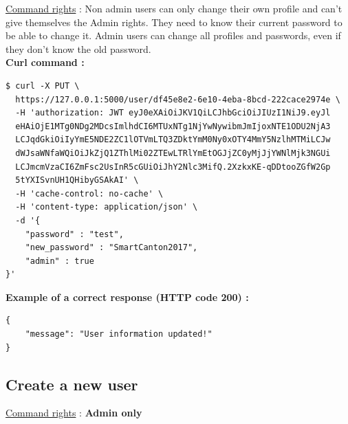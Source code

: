 \underline{Command rights} : Non admin users can only change their own profile and can't give themselves the Admin rights. They need to know their current password to be able to change it. Admin users can change all profiles and passwords, even if they don't know the old password.\\

\textbf{Curl command :}

\begin{tcolorbox}[top=-3mm, bottom=-3mm, left=0mm, right=0mm, enhanced, breakable, colback=LightGray, colframe=DarkGray, colbacktitle=DarkGray]
\begin{verbatim}
$ curl -X PUT \
  https://127.0.0.1:5000/user/df45e8e2-6e10-4eba-8bcd-222cace2974e \
  -H 'authorization: JWT eyJ0eXAiOiJKV1QiLCJhbGciOiJIUzI1NiJ9.eyJl
  eHAiOjE1MTg0NDg2MDcsImlhdCI6MTUxNTg1NjYwNywibmJmIjoxNTE1ODU2NjA3
  LCJqdGkiOiIyYmE5NDE2ZC1lOTVmLTQ3ZDktYmM0Ny0xOTY4MmY5NzlhMTMiLCJw
  dWJsaWNfaWQiOiJkZjQ1ZThlMi02ZTEwLTRlYmEtOGJjZC0yMjJjYWNlMjk3NGUi
  LCJmcmVzaCI6ZmFsc2UsInR5cGUiOiJhY2Nlc3MifQ.2XzkxKE-qDDtooZGfW2Gp
  5tYXISvnUH1QHibyGSAkAI' \
  -H 'cache-control: no-cache' \
  -H 'content-type: application/json' \
  -d '{
	"password" : "test",
	"new_password" : "SmartCanton2017",
	"admin" : true
}'
\end{verbatim}
\end{tcolorbox}

\textbf{Example of a correct response (HTTP code 200) : }

\begin{tcolorbox}[top=-3mm, bottom=-3mm, left=0mm, right=0mm, enhanced, breakable, colback=LightGray, colframe=DarkGray, colbacktitle=DarkGray]
\begin{verbatim}
{
    "message": "User information updated!"
}
\end{verbatim}
\end{tcolorbox}

\subsection{Create a new user}

\underline{Command rights} : \textbf{Admin only}\\

